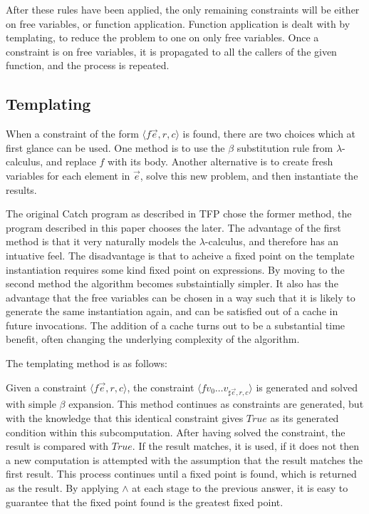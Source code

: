 \documentclass[preprint]{sigplanconf}
\newcommand{\tup}[1]{\ensuremath{\langle #1 \rangle}}
\begin{document}
After these rules have been applied, the only remaining constraints will be
either on free variables, or function application. Function application is
dealt with by templating, to reduce the problem to one on only free variables.
Once a constraint is on free variables, it is propagated to all the callers of
the given function, and the process is repeated.

\subsection{Templating}

When a constraint of the form \tup{f \overrightarrow{e},r,c} is
found, there are two choices which at first glance can be used. One
method is to use the $\beta$ substitution rule from
$\lambda$-calculus, and replace $f$ with its body. Another
alternative is to create fresh variables for each element in
$\overrightarrow{e}$, solve this new problem, and then instantiate
the results.

The original Catch program as described in TFP chose the former method, the
program described in this paper chooses the later. The advantage of the first
method is that it very naturally models the $\lambda$-calculus, and therefore
has an intuative feel. The disadvantage is that to acheive a fixed point on the
template instantiation requires some kind fixed point on expressions. By moving
to the second method the algorithm becomes substaintially simpler. It also has
the advantage that the free variables can be chosen in a way such that it is
likely to generate the same instantiation again, and can be satisfied out of a
cache in future invocations. The addition of a cache turns out to be a
substantial time benefit, often changing the underlying complexity of the
algorithm.

The templating method is as follows:

Given a constraint \tup{f \overrightarrow{e},r,c}, the constraint %
\tup{f v_0\ldots v_{\sharp \overrightarrow{e},r,c}} is generated and
solved with simple $\beta$ expansion. This method continues as
constraints are generated, but with the knowledge that this
identical constraint gives $True$ as its generated condition within
this subcomputation. After having solved the constraint, the result
is compared with $True$. If the result matches, it is used, if it
does not then a new computation is attempted with the assumption
that the result matches the first result. This process continues
until a fixed point is found, which is returned as the result. By
applying $\wedge$ at each stage to the previous answer, it is easy
to guarantee that the fixed point found is the greatest fixed point.
\end{document}

